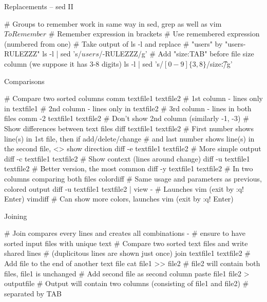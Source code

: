 \documentclass[compress, ucs, xelatex, 11pt, xcolor=svgnames,
  hyperref={
    bookmarks=true,
    unicode=true,
    colorlinks=true,
    pdftitle={Linux, command line and MetaCentrum},
    plainpages=false,
    pdfauthor={Vojtech Zeisek},
    pdfsubject={Course about use of Linux command line, writing shell scripts and using MetaCentrum of CESNET},
    pdfcreator={XeLaTeX},
    pdfkeywords={Linux, GNU, BASH, shell, command line, MetaCentrum},
    linkcolor=DarkRed,
    anchorcolor=DarkBlue,
    citecolor=Indigo,
    filecolor=NavyBlue,
    menucolor=DarkMagenta,
    urlcolor=DarkBlue,
    pdftex},
  url={hyphens, lowtilde} %
  ]{beamer}
\begin{document}
\begin{frame}[fragile]{Replacements -- sed II}
  \begin{bashcode}
    # Groups to remember work in same way in sed, grep as well as vim
    \(ToRemember\) # Remember expression in brackets
    \Number # Use remembered expression (numbered from one)
    # Take output of ls -l and replace # "users" by "users-RULEZZZ"
    ls -l | sed 's/\(users\)/\1-RULEZZZ/g'
    # Add "size:TAB" before file size column (we suppose it has 3-8 digits)
    ls -l | sed 's/\([0-9]\{3,8\}\)/size:\t\1/g'
  \end{bashcode}
\end{frame}

\begin{frame}[fragile]{Comparisons}
  \begin{bashcode}
    # Compare two sorted columns
    comm textfile1 textfile2
      # 1st column - lines only in textfile1
      # 2nd column - lines only in textfile2
      # 3rd column - lines in both files
    comm -2 textfile1 textfile2 # Don't show 2nd column (similarly -1, -3)
    # Show differences between text files
    diff textfile1 textfile2
      # First number shows line(s) in 1st file, then if add/delete/change
      # and last number shows line(s) in the second file, <> show direction
    diff -e textfile1 textfile2 # More simple output
    diff -c textfile1 textfile2 # Show context (lines around change)
    diff -u textfile1 textfile2 # Better version, the most common
    diff -y textfile1 textfile2 # In two columns comparing both files
    colordiff # Same usage and parameters as previous, colored output
    diff -u textfile1 textfile2 | view - # Launches vim (exit by :q! Enter)
    vimdiff # Can show more colors, launches vim (exit by :q! Enter)
  \end{bashcode}
\end{frame}

\begin{frame}[fragile]{Joining}
  \begin{bashcode}
    # Join compares every lines and creates all combinations -
    # ensure to have sorted input files with unique text
    # Compare two sorted text files and write shared lines
    # (duplicitous lines are shown just once)
    join textfile1 textfile2
    # Add file to the end of another text file
    cat file1 >> file2 # file2 will contain both files, file1 is unchanged
    # Add second file as second column
    paste file1 file2 > outputfile
    # Output will contain two columns (consisting of file1 and file2)
    # separated by TAB
  \end{bashcode}
\end{frame}
\end{document}
